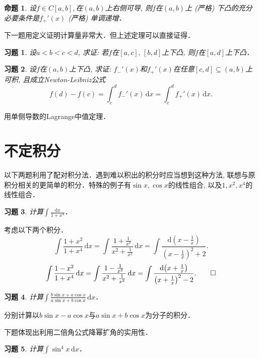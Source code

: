 \documentclass[11pt,a4paper]{ctexart}
\makeatletter
\theoremstyle{thmseries} %
\newtheorem{prop}{命题}[section]
\theoremstyle{exerseries}
\newtheorem{exer}{习题}[section]
\renewenvironment{proof}[1][\proofname]{\par
  \pushQED{\qed}%
  \normalfont \topsep6\p@\@plus6\p@\relax
  \trivlist
  \item[\hskip\labelsep
        \itshape
    #1\@addpunct{}]\ignorespaces
}{%
  \popQED\endtrivlist\@endpefalse
}
\newenvironment{sol}{\begin{proof}[\bfseries\upshape 解\quad]}{\end{proof}}
\newenvironment{pf}{\begin{proof}[\bfseries\upshape 证\quad]}{\end{proof}}
\newcommand{\bra}[1]{\mathopen{}\left(#1\right)}
\renewcommand{\d}{\mathrm{d}}
\makeatother
\begin{document}
\begin{prop}
	设$f\in C[a,b],$在$(a,b)$上右侧可导, 则$f$在$(a,b)$上 (严格) 下凸的充分必要条件是$f_+'(x)$ (严格) 单调递增．
\end{prop}

下一题用定义证明计算量非常大．但上述定理可以直接证得．
\begin{exer}
	设$a<b<c<d$, 求证: 若$f$在$[a,c],\,[b,d]$上下凸, 则$f$在$[a,d]$上下凸．
\end{exer}

\begin{exer}
	设$f$在$(a,b)$上下凸, 求证: $f_-'(x)$和$f_+'(x)$在任意$[c,d]\subseteq(a,b)$上可积, 且成立Newton-Leibniz公式
	\[f(d)-f(c)=\int_{c}^{d}f_-'(x)\,\d x=\int_{c}^{d}f_+'(x)\,\d x.\]
\end{exer}
\begin{pf}
	用单侧导数的Lagrange中值定理．
\end{pf}


\section{不定积分}
以下两题利用了配对积分法．遇到难以积出的积分时应当想到这种方法, 联想与原积分相关的更简单的积分．特殊的例子有$\sin x,\cos x$的线性组合, 以及$1,x^2,x^4$的线性组合．
\begin{exer}
	计算$\int\frac{\d x}{1+x^4}$．
\end{exer}
\begin{sol}
	考虑以下两个积分．
	\[\int\frac{1+x^2}{1+x^4}\,\d x=\int\frac{1+\frac{1}{x^2}}{x^2+\frac{1}{x^2}}\,\d x=\int\frac{\d\bra{x-\frac{1}{x}}}{\bra{x-\frac{1}{x}}^2+2}.\]
	\[\int\frac{1-x^2}{1+x^4}\,\d x=\int\frac{1-\frac{1}{x^2}}{x^2+\frac{1}{x^2}}\,\d x=\int\frac{\d\bra{x+\frac{1}{x}}}{\bra{x+\frac{1}{x}}^2-2}.\qedhere\]
\end{sol}

\begin{exer}
	计算$\int\frac{b\sin x+a\cos x}{a\sin x+b\cos x}\,\d x$．
\end{exer}
\begin{sol}
	分别计算以$b\sin x-a\cos x$与$a\sin x+b\cos x$为分子的积分．
\end{sol}

下题体现出利用二倍角公式降幂扩角的实用性．
\begin{exer}
	计算$\int \sin^4x\,\d x$．
\end{exer}

\end{document}
